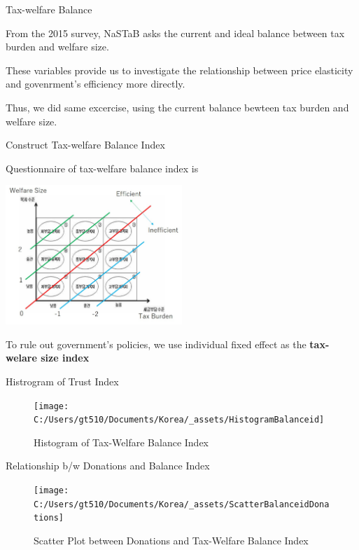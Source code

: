 \documentclass[
  ignorenonframetext,
]{beamer}
\begin{document}
\begin{frame}{Tax-welfare Balance}
\protect\hypertarget{tax-welfare-balance}{}

From the 2015 survey, NaSTaB asks the current and ideal balance between
tax burden and welfare size.

These variables provide us to investigate the relationship between price
elasticity and govenrment's efficiency more directly.

Thus, we did same excercise, using the current balance bewteen tax
burden and welfare size.

\end{frame}

\begin{frame}{Construct Tax-welfare Balance Index}
\protect\hypertarget{construct-tax-welfare-balance-index}{}

Questionnaire of tax-welfare balance index is

\includegraphics[width=0.5\textwidth,height=\textheight]{_assets/BalanceQuestion.jpg}

To rule out government's policies, we use individual fixed effect as the
\textbf{tax-welare size index}

\end{frame}

\begin{frame}{Histrogram of Trust Index}
\protect\hypertarget{histrogram-of-trust-index-1}{}

\begin{figure}
\texttt{[image: C:/Users/gt510/Documents/Korea/\_assets/HistogramBalanceid]} \caption{Histogram of Tax-Welfare Balance Index}\label{fig:unnamed-chunk-8}
\end{figure}

\end{frame}

\begin{frame}{Relationship b/w Donations and Balance Index}
\protect\hypertarget{relationship-bw-donations-and-balance-index}{}

\begin{figure}
\texttt{[image: C:/Users/gt510/Documents/Korea/\_assets/ScatterBalanceidDonations]} \caption{Scatter Plot between Donations and Tax-Welfare Balance Index}\label{fig:unnamed-chunk-9}
\end{figure}

\end{frame}
\end{document}
